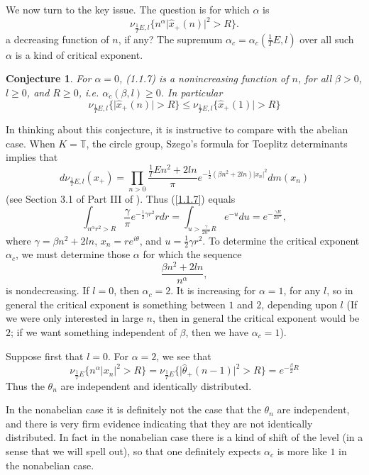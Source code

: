 \documentclass{amsart}
\theoremstyle{conjecture}
\newtheorem{conjecture}{Conjecture}
\theoremstyle{definition}
\theoremstyle{question}
\theoremstyle{questions}
\theoremstyle{remark}
\theoremstyle{remarks}
\theoremstyle{example}
\numberwithin{equation}{section}
\begin{document}
We now turn to the key issue.  The question is for
which $\alpha$ is
$$\nu_{\frac 1T E ,l}\{n^{\alpha}\vert\hat {x}_{+}(n)\vert^2>R\}. \label{1.1.7}$$
a decreasing function of $n$, if any?  The supremum
$\alpha_c=\alpha_c(\frac 1T E ,l)$ over all such $\alpha$ is a kind of critical
exponent.

\begin{conjecture}\label{1.1.8}For $\alpha =0$, (1.1.7) is a
nonincreasing function of $n$, for all $\beta >0$, $l\ge 0$, and
$R\ge 0$, i.e.  $\alpha_c(\beta ,l)\ge 0$.  In particular
$$\nu_{\frac 1T E ,l}\{\vert\hat {x}_{+}(n)\vert >R\}\le\nu_{\frac 1T E ,l}
\{\hat {x}_{+}(1)\vert >R\}$$
\end{conjecture}

In thinking about this conjecture, it is instructive to
compare with the abelian case.  When $K=\mathbb T$, the circle
group, Szego's formula for Toeplitz determinants implies
that
$$d\nu_{\frac 1T E ,l}(x_{+})=\prod_{n>0}\frac {\frac 1T E n^2+2ln}{\pi}e^{
-\frac 12(\beta n^2+2ln)\vert x_n\vert^2}dm(x_n)$$
(see Section 3.1 of Part III of \cite{Pi1}).  Thus (\ref{1.1.7}) equals
$$\int_{n^{\alpha}r^2>R}\frac {\gamma}{\pi}e^{-\frac 12\gamma r^2}
rdr=\int_{u>\frac {\gamma}{2n^{\alpha}}R}e^{-u}du=e^{-\frac {\gamma
R}{2n^{\alpha}}},$$
where $\gamma =\beta n^2+2ln$, $x_n=re^{i\theta}$, and $u=\frac 1
2\gamma r^2$.  To
determine the critical exponent $\alpha_c$, we must determine
those $\alpha$ for which the sequence
$$\frac {\beta n^2+2ln}{n^{\alpha}},$$
is nondecreasing.  If $l=0$, then $\alpha_c=2$.  It is increasing
for $\alpha =1$, for any $l$, so in general the critical exponent
is something between $1$ and $2$, depending upon $l$ (If we
were only interested in large $n$, then in general the
critical exponent would be $2$; if we want something
independent of $\beta$, then we have $\alpha_c=1$).

Suppose first that $l=0$.  For $\alpha =2$, we see that
$$\nu_{\frac 1T E}\{n^{\alpha}\vert x_n\vert^2>R\}=\nu_{\frac 1T E}\{\vert\hat{
\theta}_{+}(n-1)\vert^2>R\}=e^{-\frac {\beta}2R}$$
Thus the $\theta_n$ are independent and identically distributed.

In the nonabelian case it is definitely not the case that
the $\theta_n$ are independent, and there is very firm evidence
indicating that they are not identically distributed.  In
fact in the nonabelian case there
is a kind of shift of the level (in a sense that we will
spell out), so that one definitely expects $\alpha_c$ is more like
$1$ in the nonabelian case.
\end{document}
